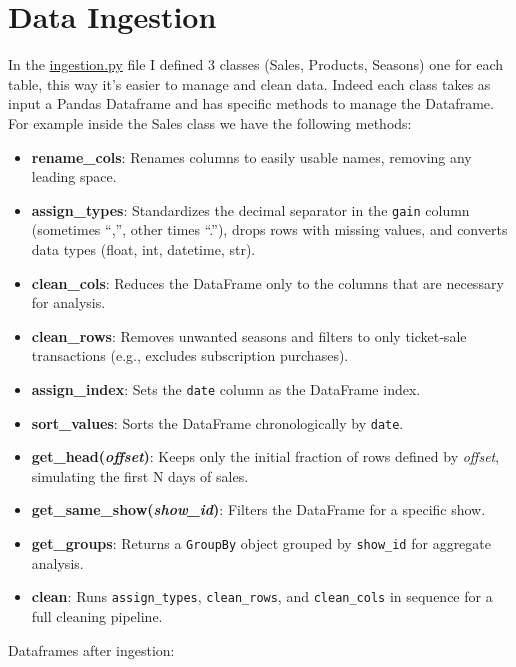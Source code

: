 \documentclass{Configuration_Files/PoliMi3i_thesis}
\begin{document}
\section{Data Ingestion}
In the \href{https://github.com/SiniscalchiCarlo/piccolo_teatro/blob/develop/piccolo_teatro/data_pipeline/ingestion.py}{ingestion.py} file I defined 3 classes (Sales, Products, Seasons) one for each table, this way it's easier to manage and clean data.
Indeed each class takes as input a Pandas Dataframe and has specific methods to manage the Dataframe.
For example inside the Sales class we have the following methods:
\begin{itemize}
	\item \textbf{rename\_cols}: Renames columns to easily usable names, removing any leading space.
	\item \textbf{assign\_types}: Standardizes the decimal separator in the \texttt{gain} column (sometimes “,”, other times “.”), drops rows with missing values, and converts data types (float, int, datetime, str).
	\item \textbf{clean\_cols}: Reduces the DataFrame only to the columns that are necessary for analysis.
	\item \textbf{clean\_rows}: Removes unwanted seasons and filters to only ticket‐sale transactions (e.g., excludes subscription purchases).
	\item \textbf{assign\_index}: Sets the \texttt{date} column as the DataFrame index.
	\item \textbf{sort\_values}: Sorts the DataFrame chronologically by \texttt{date}.
	\item \textbf{get\_head(\emph{offset})}: Keeps only the initial fraction of rows defined by \emph{offset}, simulating the first N days of sales.
	\item \textbf{get\_same\_show(\emph{show\_id})}: Filters the DataFrame for a specific show.
	\item \textbf{get\_groups}: Returns a \texttt{GroupBy} object grouped by \texttt{show\_id} for aggregate analysis.
	\item \textbf{clean}: Runs \texttt{assign\_types}, \texttt{clean\_rows}, and \texttt{clean\_cols} in sequence for a full cleaning pipeline.
\end{itemize}
\clearpage
Dataframes after ingestion:
\end{document}
